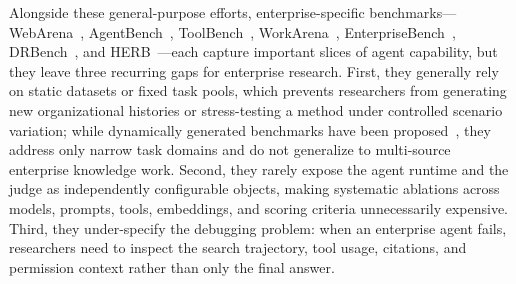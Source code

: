 \documentclass[journal,dvipsnames]{acmart}
\begin{document}
Alongside these general-purpose efforts, enterprise-specific benchmarks---WebArena~\cite{zhou2023webarena}, AgentBench~\cite{liu2023agentbench}, ToolBench~\cite{qin2023toolllm}, WorkArena~\cite{drouin2024workarena}, EnterpriseBench~\cite{vishwakarma2025enterprisebench}, DRBench~\cite{abaskohi2025drbench}, and HERB~\cite{choubey2025benchmarking}---each capture important slices of agent capability, but they leave three recurring gaps for enterprise research. First, they generally rely on static datasets or fixed task pools, which prevents researchers from generating new organizational histories or stress-testing a method under controlled scenario variation; while dynamically generated benchmarks have been proposed~\cite{saxena2025continuous}, they address only narrow task domains and do not generalize to multi-source enterprise knowledge work. Second, they rarely expose the agent runtime and the judge as independently configurable objects, making systematic ablations across models, prompts, tools, embeddings, and scoring criteria unnecessarily expensive. Third, they under-specify the debugging problem: when an enterprise agent fails, researchers need to inspect the search trajectory, tool usage, citations, and permission context rather than only the final answer.
\end{document}
